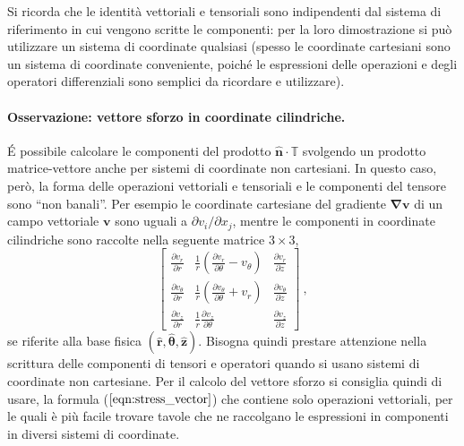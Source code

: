 \begin{remark}
Si ricorda che le identità vettoriali e tensoriali sono indipendenti dal sistema di riferimento in cui vengono scritte le componenti: per la loro dimostrazione si può utilizzare un sistema di coordinate qualsiasi (spesso le coordinate cartesiani sono un sistema di coordinate conveniente, poiché le espressioni delle operazioni e degli operatori differenziali sono semplici da ricordare e utilizzare).
\end{remark}

\paragraph{Osservazione: vettore sforzo in coordinate cilindriche.} \'E possibile calcolare le componenti del prodotto $\bm{\hat{n}} \cdot \mathbb{T}$ svolgendo un prodotto matrice-vettore anche per sistemi di coordinate non cartesiani. In questo caso, però, la forma delle operazioni vettoriali e tensoriali e le componenti del tensore sono ``non banali''. Per esempio le coordinate cartesiane del gradiente $\bm{\nabla} \bm{v}$ di un campo vettoriale $\bm{v}$ sono uguali a $\partial v_i / \partial x_j$, mentre le componenti in coordinate cilindriche sono raccolte nella seguente matrice $3\times 3$,
\begin{equation}
\begin{bmatrix}
\frac{\partial v_r}{\partial r} & 
 \frac{1}{r}\left( \frac{\partial v_r}{\partial \theta}-v_\theta \right) &
 \frac{\partial v_r}{\partial z}   \\
\frac{\partial v_\theta}{\partial r} & 
 \frac{1}{r}\left( \frac{\partial v_\theta}{\partial \theta}+v_r \right) & 
 \frac{\partial v_\theta}{\partial z} \\
\frac{\partial v_z}{\partial r} &
 \frac{1}{r}\frac{\partial v_z}{\partial \theta} &
 \frac{\partial v_z}{\partial z}
\end{bmatrix} \ ,
\end{equation}
se riferite alla base fisica $(\bm{\hat{r}},\bm{\hat{\theta}},\bm{\hat{z}})$.
Bisogna quindi prestare attenzione nella scrittura delle componenti di tensori e operatori quando si usano sistemi di coordinate non cartesiane.
Per il calcolo del vettore sforzo si consiglia quindi di usare, la formula ($\ref{eqn:stress_vector}$) che contiene solo operazioni vettoriali, per le quali è più facile trovare tavole che ne raccolgano le espressioni in componenti in diversi sistemi di coordinate.

